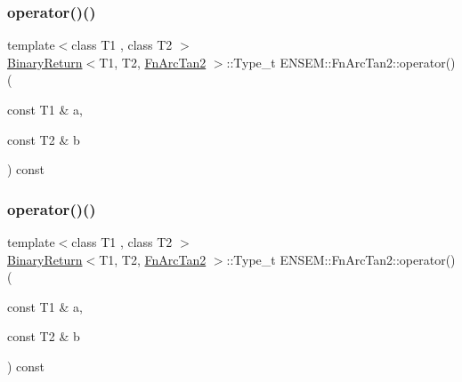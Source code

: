 \subsubsection{\texorpdfstring{operator()()}{operator()()}\hspace{0.1cm}{\footnotesize\ttfamily [1/3]}}
{\footnotesize\ttfamily template$<$class T1 , class T2 $>$ \\
\mbox{\hyperlink{structENSEM_1_1BinaryReturn}{Binary\+Return}}$<$T1, T2, \mbox{\hyperlink{structENSEM_1_1FnArcTan2}{Fn\+Arc\+Tan2}} $>$\+::Type\+\_\+t E\+N\+S\+E\+M\+::\+Fn\+Arc\+Tan2\+::operator() (\begin{DoxyParamCaption}\item[{const T1 \&}]{a,  }\item[{const T2 \&}]{b }\end{DoxyParamCaption}) const\hspace{0.3cm}{\ttfamily [inline]}}

\mbox{\label{structENSEM_1_1FnArcTan2_a85fa496fe2e31b3576d34560143f5b8f}} 
\subsubsection{\texorpdfstring{operator()()}{operator()()}\hspace{0.1cm}{\footnotesize\ttfamily [2/3]}}
{\footnotesize\ttfamily template$<$class T1 , class T2 $>$ \\
\mbox{\hyperlink{structENSEM_1_1BinaryReturn}{Binary\+Return}}$<$T1, T2, \mbox{\hyperlink{structENSEM_1_1FnArcTan2}{Fn\+Arc\+Tan2}} $>$\+::Type\+\_\+t E\+N\+S\+E\+M\+::\+Fn\+Arc\+Tan2\+::operator() (\begin{DoxyParamCaption}\item[{const T1 \&}]{a,  }\item[{const T2 \&}]{b }\end{DoxyParamCaption}) const\hspace{0.3cm}{\ttfamily [inline]}}

\mbox{\label{structENSEM_1_1FnArcTan2_a85fa496fe2e31b3576d34560143f5b8f}} 
